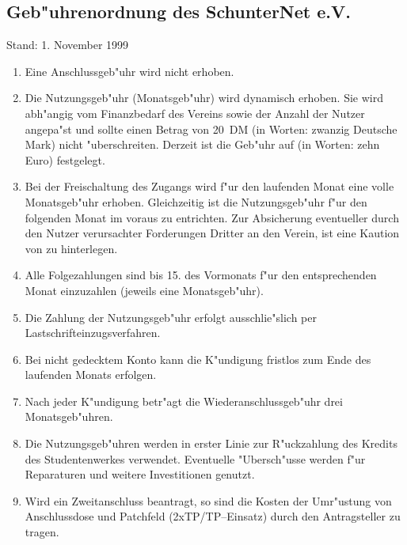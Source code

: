 \documentclass[12pt,titlepage,twoside]{scrartcl}
\newcounter{para_nr}
\begin{document}
\begin{appendix}
\clearpage

\section{Geb"uhrenordnung des SchunterNet e.V.}
\label{gebuehr}

{\small Stand: 1. November 1999}

\begin{enumerate}
\item Eine Anschlussgeb"uhr wird nicht erhoben.

\item Die Nutzungsgeb"uhr (Monatsgeb"uhr) wird dynamisch erhoben. Sie
  wird abh"angig vom Finanzbedarf des Vereins sowie der Anzahl der
  Nutzer angepa"st und sollte einen Betrag von 20~DM (in Worten:
  zwanzig Deutsche Mark) nicht "uberschreiten.
  Derzeit ist die Geb"uhr auf  (in Worten: zehn Euro) festgelegt. 

\item Bei der Freischaltung des Zugangs wird f"ur den laufenden Monat
  eine volle Monatsgeb"uhr erhoben. Gleichzeitig ist die Nutzungsgeb"uhr
  f"ur den folgenden Monat im voraus zu entrichten. Zur Absicherung eventueller
  durch den Nutzer verursachter Forderungen Dritter an den Verein, ist eine
  Kaution von  zu hinterlegen.

\item Alle Folgezahlungen sind bis 15. des Vormonats f"ur den
  entsprechenden Monat einzuzahlen (jeweils eine Monatsgeb"uhr).

\item Die Zahlung der Nutzungsgeb"uhr erfolgt ausschlie"slich per
  Lastschrifteinzugsverfahren.

\item Bei nicht gedecktem Konto kann die K"undigung fristlos zum Ende
  des laufenden Monats erfolgen.

\item Nach jeder K"undigung betr"agt die Wiederanschlussgeb"uhr drei
  Monatsgeb"uhren.

\item Die Nutzungsgeb"uhren werden in erster Linie zur R"uckzahlung des
  Kredits des Studentenwerkes verwendet. Eventuelle "Ubersch"usse
  werden f"ur Reparaturen und weitere Investitionen genutzt.

\item Wird ein Zweitanschluss beantragt, so sind die Kosten der
  Umr"ustung von Anschlussdose und Patchfeld (2xTP/TP--Einsatz) durch den
  Antragsteller zu tragen.


\end{enumerate}
\end{appendix}
\end{document}
